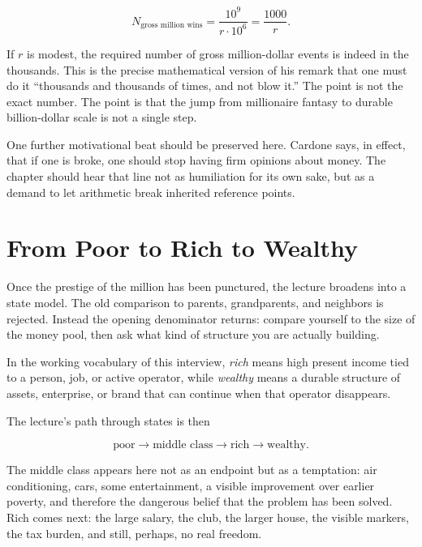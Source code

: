 \begin{equation}
N_{\text{gross million wins}}
=
\frac{10^9}{r\cdot 10^6}
=
\frac{1000}{r}.
\end{equation}

If \(r\) is modest, the required number of gross million-dollar events is indeed in the thousands. This is the precise mathematical version of his remark that one must do it ``thousands and thousands of times, and not blow it.'' The point is not the exact number. The point is that the jump from millionaire fantasy to durable billion-dollar scale is not a single step.

One further motivational beat should be preserved here. Cardone says, in effect, that if one is broke, one should stop having firm opinions about money. The chapter should hear that line not as humiliation for its own sake, but as a demand to let arithmetic break inherited reference points.

\section{From Poor to Rich to Wealthy}

Once the prestige of the million has been punctured, the lecture broadens into a state model. The old comparison to parents, grandparents, and neighbors is rejected. Instead the opening denominator returns: compare yourself to the size of the money pool, then ask what kind of structure you are actually building.

\begin{definition}
In the working vocabulary of this interview, \emph{rich} means high present income tied to a person, job, or active operator, while \emph{wealthy} means a durable structure of assets, enterprise, or brand that can continue when that operator disappears.
\end{definition}

The lecture's path through states is then

\begin{equation}
\text{poor}\to\text{middle class}\to\text{rich}\to\text{wealthy}.
\end{equation}

The middle class appears here not as an endpoint but as a temptation: air conditioning, cars, some entertainment, a visible improvement over earlier poverty, and therefore the dangerous belief that the problem has been solved. Rich comes next: the large salary, the club, the larger house, the visible markers, the tax burden, and still, perhaps, no real freedom.


